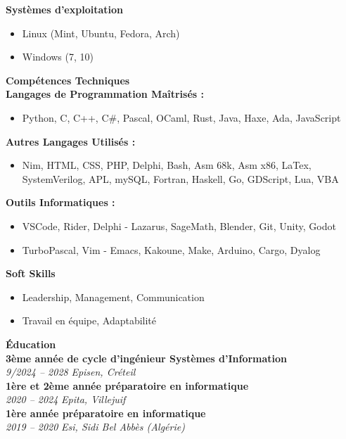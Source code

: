 \documentclass[a4paper,11pt]{article}
\newcommand{\cvsection}[1]{\vspace{1em}\noindent\textbf{\textcolor{cvhighlight}{\LARGE #1}}\vspace{0.5em}\\}
\newcommand{\cvevent}[3]{\textbf{#1} \\ \textit{#2} \hfill \textit{#3} \vspace{0.5em}}
\newcommand{\cvitem}[1]{\item #1}
\begin{document}
\begin{paracol}{2}
\colorbox{sectionbg1}{
    \parbox{\linewidth}{
        \cvsection{\faDesktop \hspace{0em} Systèmes d'exploitation}
        \vspace{-1em}
        \begin{itemize}[leftmargin=0.5cm, itemsep=0pt, topsep=0pt]
            \cvitem{Linux (Mint, Ubuntu, Fedora, Arch)}
            \cvitem{Windows (7, 10)}
        \end{itemize}
    }
}
\medskip

\colorbox{sectionbg2}{
    \parbox{\linewidth}{
        \cvsection{\faCode \hspace{0.5em} Compétences Techniques}
        \textbf{Langages de Programmation Maîtrisés :}
        \begin{itemize}[leftmargin=0.5cm, itemsep=0pt, topsep=0pt]
            \cvitem{Python, C, C++, C\#, Pascal, OCaml, Rust, Java, Haxe, Ada, JavaScript}
        \end{itemize}
        \textbf{Autres Langages Utilisés :}
        \begin{itemize}[leftmargin=0.5cm, itemsep=0pt, topsep=0pt]
            \cvitem{Nim, HTML, CSS, PHP, Delphi, Bash, Asm 68k, Asm x86, LaTex, SystemVerilog, APL, mySQL, Fortran, Haskell, Go, GDScript, Lua, VBA}
        \end{itemize}
        \textbf{Outils Informatiques :}
        \begin{itemize}[leftmargin=0.5cm, itemsep=0pt, topsep=0pt]
            \cvitem{VSCode, Rider, Delphi - Lazarus, SageMath, Blender, Git, Unity, Godot}
            \cvitem{TurboPascal, Vim - Emacs, Kakoune, Make, Arduino, Cargo, Dyalog}
        \end{itemize}
    }
}
\medskip

\switchcolumn

\colorbox{sectionbg1}{
    \parbox{\linewidth}{
        \cvsection{\faLightbulb \hspace{0.5em} Soft Skills}
        \vspace{-1em}
        \begin{itemize}[leftmargin=0.5cm, itemsep=0pt, topsep=0pt]
            \cvitem{Leadership, Management, Communication}
            \cvitem{Travail en équipe, Adaptabilité}
        \end{itemize}
    }
}
\medskip

\colorbox{sectionbg2}{
    \parbox{\linewidth}{
        \cvsection{\faGraduationCap \hspace{0.5em} Éducation}
        \cvevent{3ème année de cycle d'ingénieur Systèmes d’Information}{9/2024 – 2028}{Episen, Créteil} \\
        \cvevent{1ère et 2ème année préparatoire en informatique}{2020 – 2024}{Epita, Villejuif} \\
        \cvevent{1ère année préparatoire en informatique}{2019 – 2020}{Esi, Sidi Bel Abbès (Algérie)}
    }
}
\medskip


\end{paracol}
\end{document}
